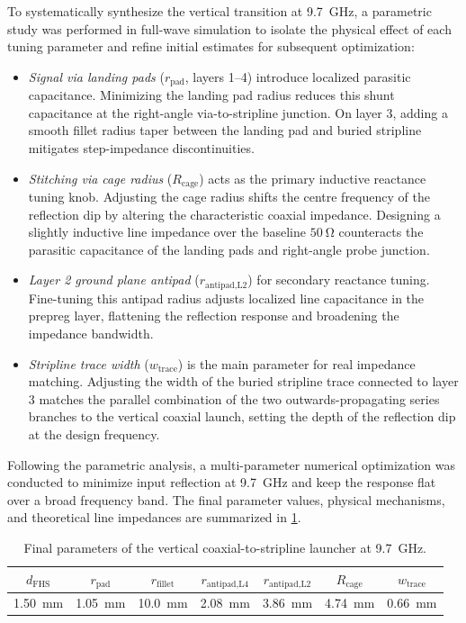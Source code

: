 To systematically synthesize the vertical transition at \qty{9.7}{\giga\hertz}, a parametric study was performed in full-wave simulation to isolate the physical effect of each tuning parameter and refine initial estimates for subsequent optimization:
\begin{itemize}
    \item \textit{Signal via landing pads} ($r_{\text{pad}}$, layers 1--4) introduce localized parasitic capacitance.
    Minimizing the landing pad radius reduces this shunt capacitance at the right-angle via-to-stripline junction.
    On layer 3, adding a smooth fillet radius taper between the landing pad and buried stripline mitigates step-impedance discontinuities.
    \item \textit{Stitching via cage radius} ($R_{\text{cage}}$) acts as the primary inductive reactance tuning knob.
    Adjusting the cage radius shifts the centre frequency of the reflection dip by altering the characteristic coaxial impedance.
    Designing a slightly inductive line impedance over the baseline $\qty{50}{\ohm}$ counteracts the parasitic capacitance of the landing pads and right-angle probe junction.
    \item \textit{Layer 2 ground plane antipad} ($r_{\text{antipad,L2}}$) for secondary reactance tuning.
    Fine-tuning this antipad radius adjusts localized line capacitance in the prepreg layer, flattening the reflection response and broadening the impedance bandwidth.
    \item \textit{Stripline trace width} ($w_{\text{trace}}$) is the main parameter for real impedance matching.
    Adjusting the width of the buried stripline trace connected to layer 3 matches the parallel combination of the two outwards-propagating series branches to the vertical coaxial launch, setting the depth of the reflection dip at the design frequency.
\end{itemize}

Following the parametric analysis, a multi-parameter numerical optimization was conducted to minimize input reflection at \qty{9.7}{\giga\hertz} and keep the response flat over a broad frequency band.
The final parameter values, physical mechanisms, and theoretical line impedances are summarized in \cref{tab:vertical_launcher_parameters}.

\begin{table}[!ht]
    \centering
    \caption{Final parameters of the vertical coaxial-to-stripline launcher at \qty{9.7}{\giga\hertz}.}
    \label{tab:vertical_launcher_parameters}
    \small
    \begin{tabular}{ccccccc}
        \toprule
        $d_{\text{FHS}}$ & $r_{\text{pad}}$ & $r_{\text{fillet}}$ & $r_{\text{antipad,L4}}$ & $r_{\text{antipad,L2}}$ & $R_{\text{cage}}$ & $w_{\text{trace}}$ \\
        \midrule
        \qty{1.50}{\milli\metre} & \qty{1.05}{\milli\metre} & \qty{10.0}{\milli\metre} & \qty{2.08}{\milli\metre} & \qty{3.86}{\milli\metre} & \qty{4.74}{\milli\metre} & \qty{0.66}{\milli\metre} \\
        \bottomrule
    \end{tabular}
\end{table}

